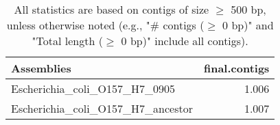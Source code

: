 \documentclass[12pt,a4paper]{article}
\begin{document}
\begin{table}[ht]
\begin{center}
\caption{All statistics are based on contigs of size $\geq$ 500 bp, unless otherwise noted (e.g., "\# contigs ($\geq$ 0 bp)" and "Total length ($\geq$ 0 bp)" include all contigs).}
\begin{tabular}{|l*{1}{|r}|}
\hline
Assemblies & final.contigs \\ \hline
Escherichia\_coli\_O157\_H7\_0905 & 1.006 \\ \hline
Escherichia\_coli\_O157\_H7\_ancestor & 1.007 \\ \hline
\end{tabular}
\end{center}
\end{table}
\end{document}
